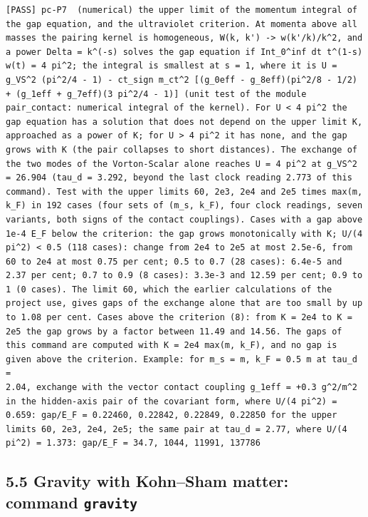 \documentclass[
  10pt,
]{article}
\begin{document}
\begin{verbatim}
[PASS] pc-P7  (numerical) the upper limit of the momentum integral of the gap equation, and the ultraviolet criterion. At momenta above all masses the pairing kernel is homogeneous, W(k, k') -> w(k'/k)/k^2, and a power Delta = k^(-s) solves the gap equation if Int_0^inf dt t^(1-s) w(t) = 4 pi^2; the integral is smallest at s = 1, where it is U = g_VS^2 (pi^2/4 - 1) - ct_sign m_ct^2 [(g_0eff - g_8eff)(pi^2/8 - 1/2) + (g_1eff + g_7eff)(3 pi^2/4 - 1)] (unit test of the module pair_contact: numerical integral of the kernel). For U < 4 pi^2 the gap equation has a solution that does not depend on the upper limit K, approached as a power of K; for U > 4 pi^2 it has none, and the gap grows with K (the pair collapses to short distances). The exchange of the two modes of the Vorton-Scalar alone reaches U = 4 pi^2 at g_VS^2 = 26.904 (tau_d = 3.292, beyond the last clock reading 2.773 of this command). Test with the upper limits 60, 2e3, 2e4 and 2e5 times max(m, k_F) in 192 cases (four sets of (m_s, k_F), four clock readings, seven variants, both signs of the contact couplings). Cases with a gap above 1e-4 E_F below the criterion: the gap grows monotonically with K; U/(4 pi^2) < 0.5 (118 cases): change from 2e4 to 2e5 at most 2.5e-6, from 60 to 2e4 at most 0.75 per cent; 0.5 to 0.7 (28 cases): 6.4e-5 and 2.37 per cent; 0.7 to 0.9 (8 cases): 3.3e-3 and 12.59 per cent; 0.9 to 1 (0 cases). The limit 60, which the earlier calculations of the project use, gives gaps of the exchange alone that are too small by up to 1.08 per cent. Cases above the criterion (8): from K = 2e4 to K = 2e5 the gap grows by a factor between 11.49 and 14.56. The gaps of this command are computed with K = 2e4 max(m, k_F), and no gap is given above the criterion. Example: for m_s = m, k_F = 0.5 m at tau_d =
2.04, exchange with the vector contact coupling g_1eff = +0.3 g^2/m^2 in the hidden-axis pair of the covariant form, where U/(4 pi^2) = 0.659: gap/E_F = 0.22460, 0.22842, 0.22849, 0.22850 for the upper limits 60, 2e3, 2e4, 2e5; the same pair at tau_d = 2.77, where U/(4 pi^2) = 1.373: gap/E_F = 34.7, 1044, 11991, 137786
\end{verbatim}

\hypertarget{gravity-with-kohnsham-matter-command-gravity}{%
\subsection{\texorpdfstring{5.5 Gravity with Kohn--Sham matter: command
\texttt{gravity}}{5.5 Gravity with Kohn--Sham matter: command gravity}}\label{gravity-with-kohnsham-matter-command-gravity}}
\end{document}
